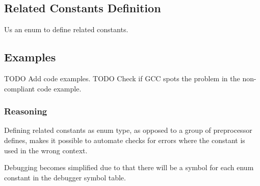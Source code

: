 \subsection{Related Constants Definition}

Us an enum to define related constants.

\subsection{Examples}

TODO Add code examples.
TODO Check if GCC spots the problem in the non-compliant code example.

\subsubsection{Reasoning}

Defining related constants as enum type, as opposed to a group of preprocessor defines, makes it possible to automate checks for errors where the constant is used in the wrong context.

Debugging becomes simplified due to that there will be a symbol for each enum constant in the debugger symbol table.
